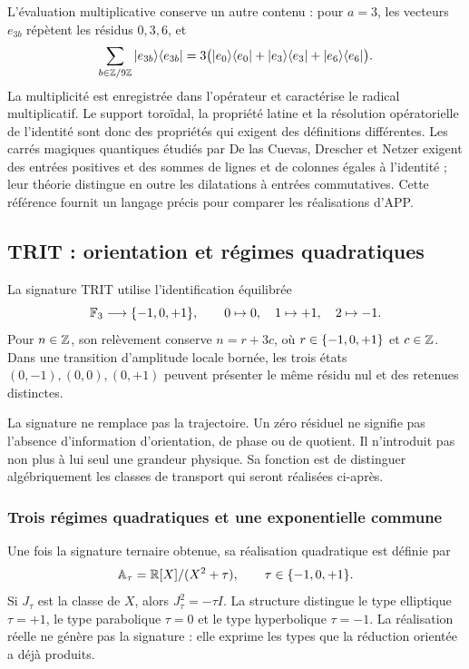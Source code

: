 L'évaluation multiplicative conserve un autre contenu : pour \(a=3\), les
vecteurs \(e_{3b}\) répètent les résidus \(0,3,6\), et
\[
 \sum_{b\in\mathbb Z/9\mathbb Z}|e_{3b}\rangle\langle e_{3b}|
 =3\bigl(|e_0\rangle\langle e_0|+|e_3\rangle\langle e_3|
                    +|e_6\rangle\langle e_6|\bigr).
\]
La multiplicité est enregistrée dans l'opérateur et caractérise le radical
multiplicatif. Le support toroïdal, la propriété latine et la
résolution opératorielle de l'identité sont donc des propriétés qui exigent
des définitions différentes. Les carrés magiques quantiques étudiés par
De las Cuevas, Drescher et Netzer exigent des entrées positives et des sommes de lignes
et de colonnes égales à l'identité ; leur théorie distingue en outre les
dilatations à entrées commutatives\cite{delascuevas2020}. Cette référence
fournit un langage précis pour comparer les réalisations d'APP.

\subsection{TRIT : orientation et régimes quadratiques}

\begin{definition}
La signature TRIT utilise l'identification équilibrée
\[
 \mathbb F_3\longrightarrow\{-1,0,+1\},\qquad 0\mapsto0,\quad1\mapsto+1,\quad2\mapsto-1.
\]
Pour \(n\in\mathbb Z\), son relèvement conserve \(n=r+3c\), où \(r\in\{-1,0,+1\}\) et \(c\in\mathbb Z\). Dans une transition d'amplitude locale bornée, les trois états \((0,-1),(0,0),(0,+1)\) peuvent présenter le même résidu nul et des retenues distinctes.
\end{definition}

La signature ne remplace pas la trajectoire. Un zéro résiduel ne signifie pas l'absence d'information d'orientation, de phase ou de quotient. Il n'introduit pas non plus à lui seul une grandeur physique. Sa fonction est de distinguer algébriquement les classes de transport qui seront réalisées ci-après.

\subsubsection{Trois régimes quadratiques et une exponentielle commune}

Une fois la signature ternaire obtenue, sa réalisation quadratique est définie par
\begin{equation}
 \mathbb A_\tau=\mathbb R[X]/(X^2+\tau),\qquad \tau\in\{-1,0,+1\}.
 \label{eq:algebras-trit}
\end{equation}
Si \(J_\tau\) est la classe de \(X\), alors \(J_\tau^2=-\tau I\). La structure distingue le type elliptique \(\tau=+1\), le type parabolique \(\tau=0\) et le type hyperbolique \(\tau=-1\). La réalisation réelle ne génère pas la signature : elle exprime les types que la réduction orientée a déjà produits.

